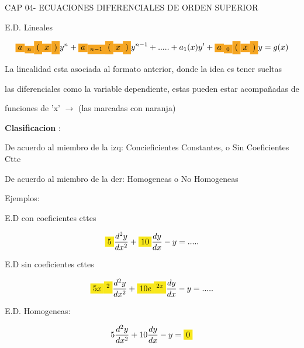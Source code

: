 \documentclass{article}
\begin{document}
CAP 04- ECUACIONES DIFERENCIALES DE ORDEN SUPERIOR



E.D. Lineales


\begin{gather*}
\text{\colorbox[RGB]{245,166,35}{$a$}}\text{\colorbox[RGB]{245,166,35}{$_{n}$}}\text{\colorbox[RGB]{245,166,35}{$($}}\text{\colorbox[RGB]{245,166,35}{$x$}}\text{\colorbox[RGB]{245,166,35}{$)$}}y^{n}+\text{\colorbox[RGB]{245,166,35}{$a$}}\text{\colorbox[RGB]{245,166,35}{$_{n-1}$}}\text{\colorbox[RGB]{245,166,35}{$($}}\text{\colorbox[RGB]{245,166,35}{$x$}}\text{\colorbox[RGB]{245,166,35}{$)$}}y^{n-1}+.....+a_{1}(x)y'+\text{\colorbox[RGB]{245,166,35}{$a$}}\text{\colorbox[RGB]{245,166,35}{$_{0}$}}\text{\colorbox[RGB]{245,166,35}{$($}}\text{\colorbox[RGB]{245,166,35}{$x$}}\text{\colorbox[RGB]{245,166,35}{$)$}}y=g(x)
\end{gather*}


La linealidad esta asociada al formato anterior, donde la idea es tener sueltas 

las diferenciales como la variable dependiente, estas pueden estar acompañadas de

funciones de 'x' $\rightarrow$   (las marcadas con naranja) 

\textbf{Clasificacion} :

De acuerdo al miembro de la izq: Concieficientes Constantes, o Sin Coeficientes Ctte

De acuerdo al miembro de la der: Homogeneas o No Homogeneas

Ejemplos:

E.D con coeficientes cttes 


\begin{gather*}
\text{\colorbox[RGB]{248,231,28}{$5$}}\frac{d^{2}y}{dx^{2}}+\text{\colorbox[RGB]{248,231,28}{$10$}}\frac{dy}{dx}-y = .....
\end{gather*}


E.D sin coeficientes cttes 


\begin{gather*}
\text{\colorbox[RGB]{248,231,28}{$5x$}}\text{\colorbox[RGB]{248,231,28}{$^{2}$}}\frac{d^{2}y}{dx^{2}}+\text{\colorbox[RGB]{248,231,28}{$10e$}}\text{\colorbox[RGB]{248,231,28}{$^{2x}$}}\frac{dy}{dx}-y = .....
\end{gather*}


E.D. Homogeneas:


\begin{gather*}
5\frac{d^{2}y}{dx^{2}}+10\frac{dy}{dx}-y =\text{\colorbox[RGB]{248,231,28}{$ 0$}}
\end{gather*}
\end{document}
